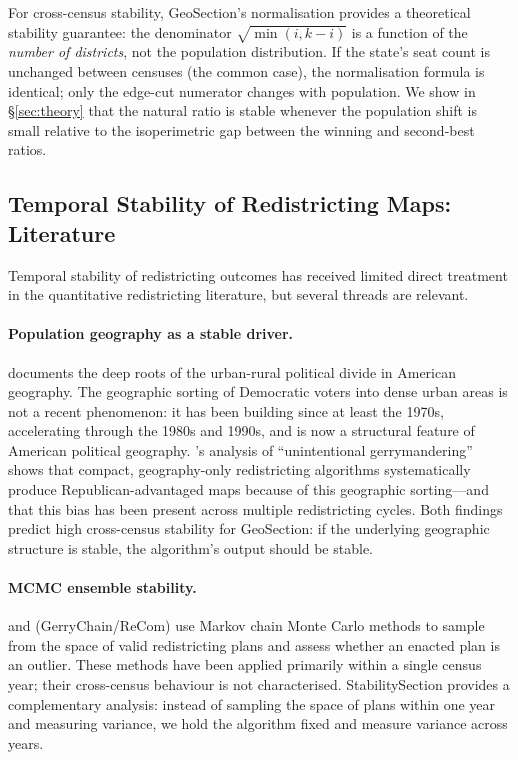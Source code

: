 For cross-census stability, GeoSection's normalisation provides a theoretical
stability guarantee: the denominator $\sqrt{\min(i,k-i)}$ is a function of
the \emph{number of districts}, not the population distribution.
If the state's seat count is unchanged between censuses (the common case), the
normalisation formula is identical; only the edge-cut numerator changes with
population.
We show in \S\ref{sec:theory} that the natural ratio is stable whenever the
population shift is small relative to the isoperimetric gap between the winning
and second-best ratios.

\subsection{Temporal Stability of Redistricting Maps: Literature}

Temporal stability of redistricting outcomes has received limited direct
treatment in the quantitative redistricting literature, but several threads
are relevant.

\paragraph{Population geography as a stable driver.}
\citet{rodden2019} documents the deep roots of the urban-rural political
divide in American geography.
The geographic sorting of Democratic voters into dense urban areas is not a
recent phenomenon: it has been building since at least the 1970s, accelerating
through the 1980s and 1990s, and is now a structural feature of American
political geography.
\citet{chen2013}'s analysis of ``unintentional gerrymandering'' shows that
compact, geography-only redistricting algorithms systematically produce
Republican-advantaged maps because of this geographic sorting---and that this
bias has been present across multiple redistricting cycles.
Both findings predict high cross-census stability for GeoSection: if the
underlying geographic structure is stable, the algorithm's output should be
stable.

\paragraph{MCMC ensemble stability.}
\citet{chikina2017} and \citet{deford2019} (GerryChain/ReCom) use Markov chain
Monte Carlo methods to sample from the space of valid redistricting plans and
assess whether an enacted plan is an outlier.
These methods have been applied primarily within a single census year; their
cross-census behaviour is not characterised.
StabilitySection provides a complementary analysis: instead of sampling the
space of plans within one year and measuring variance, we hold the algorithm
fixed and measure variance across years.

